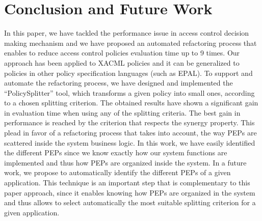 \section{Conclusion and Future Work} \label{sec:conclusion}

In this paper, we have tackled the performance issue in access control decision making mechanism 
and we have proposed an
 automated refactoring  process  
that enables to reduce access control policies evaluation time up to 9 times.
Our approach has been applied to XACML policies and it can be generalized to policies in other policy specification
languages (such as EPAL). 
To support and automate the refactoring process, we have designed and implemented the ``PolicySplitter'' tool,
which transforms a given policy into small ones,
according to a chosen splitting criterion.
The obtained results have shown a significant gain in evaluation time when using any of the splitting criteria.
 The best gain in performance is reached by
the criterion that respects the synergy property. This plead in favor of a refactoring process that takes into
 account, the way PEPs are scattered inside the system business logic. 
In this work, we have easily identified the different PEPs since we know exactly how our system functions are
 implemented and thus how PEPs are organized inside the system. In a future work, we propose to automatically identify the different PEPs of a given application. 
This technique is an important step that is complementary to this paper approach, since it enables
 knowing how PEPs are organized in the system and thus allows to select automatically the most 
suitable splitting criterion for a given application. 